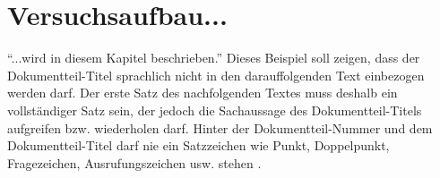 \section{Versuchsaufbau...}
"`...wird in diesem Kapitel beschrieben."'
Dieses Beispiel soll zeigen, dass der Dokumentteil-Titel sprachlich nicht in den darauffolgenden Text einbezogen werden darf.
Der erste Satz des nachfolgenden Textes muss deshalb ein vollständiger Satz sein, der jedoch die Sachaussage des Dokumentteil-Titels aufgreifen bzw. wiederholen darf.
Hinter der Dokumentteil-Nummer und dem Dokumentteil-Titel darf nie ein Satzzeichen wie Punkt, Doppelpunkt, Fragezeichen, Ausrufungszeichen usw. stehen \cite[S.~14~f.]{Hering2009}.
